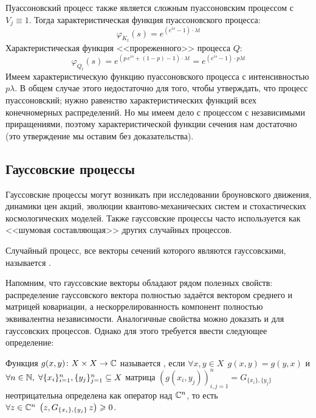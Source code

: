 \begin{solution}
    Пуассоновский процесс также является сложным пуассоновским процессом с $ V_j \equiv 1 $.
    Тогда характеристическая функция пуассоновского процесса:
    \[
        \varphi_{K_t}(s) = e^{\left(e^{i s} - 1 \right) \cdot \lambda t}
    \]
    Характеристическая функция <<прореженного>> процесса $ Q $:
    \[
        \varphi_{Q_t}(s) = e^{\left(p \, e^{i s} + (1 - p) - 1 \right) \cdot \lambda t} = e^{\left(e^{i s} - 1 \right) \cdot p \lambda t}
    \]
    Имеем характеристическую функцию пуассоновского процесса с интенсивностью $ p \lambda $.
    В общем случае этого недостаточно для того, чтобы утверждать, что процесс пуассоновский;
    нужно равенство характеристических функций всех конечномерных распределений.
    Но мы имеем дело с процессом с независимыми приращениями, поэтому характеристической функции сечения нам достаточно
    (это утверждение мы оставим без доказательства).
\end{solution}




\subsection{Гауссовские процессы} \label{subsection:gaussian}

Гауссовские процессы могут возникать при исследовании броуновского движения,
динамики цен акций, эволюции квантово-механических систем и стохастических космологических моделей.
Также гауссовские процессы часто используется как <<шумовая составляющая>> других случайных процессов.

\begin{definition}
    \label{definition:special:gaussian_process}
    Случайный процесс, все векторы сечений которого являются гауссовскими,
    называется .
\end{definition}

Напомним, что гауссовские векторы обладают рядом полезных свойств:
распределение гауссовского вектора полностью задаётся вектором среднего и матрицей ковариации,
а нескоррелированность компонент полностью эквивалентна независимости.
Аналогичные свойства можно доказать и для гауссовских процессов.
Однако для этого требуется ввести следующее определение:

\begin{definition}
    \label{definition:special:positive_semi_definite_function}
    Функция $ g(x, y) \colon X \times X \to \mathbb{C} $ называется ,
    если $ \forall x, y \in X \;\, g(x, y) = g(y, x) $ и $ \forall n \in \mathbb{N}, \; \forall \{x_i\}_{i=1}^n, \{y_j\}_{j=1}^n \subseteq X $
    матрица $ (g(x_i, y_j))_{i,j=1}^n = G_{\{x_i\}, \{y_j\}} $ неотрицательна определена как оператор над $ \mathbb{C}^n $,
    то есть $ \forall z \in \mathbb{C}^n \; \left(z, G_{\{x_i\}, \{y_j\}} \, z\right) \geqslant 0 $.
\end{definition}


